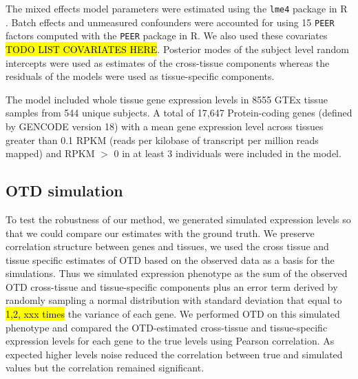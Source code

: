 \documentclass[10pt,letterpaper]{article}
\begin{document}
The mixed effects model parameters were estimated using the \texttt{lme4} package \cite{Bates_2015a} in R \cite{R_Core_Team_2015}. Batch effects and unmeasured confounders were accounted for using 15 \texttt{PEER} factors computed with the \texttt{PEER} \cite{Stegle_2012} package in R. 
We also used these covariates \hl{TODO LIST COVARIATES HERE}.
Posterior modes of the subject level random intercepts were used as estimates of the cross-tissue components whereas the residuals of the models were used as tissue-specific components.

The model included whole tissue gene expression levels in 8555 GTEx
tissue samples from 544 unique subjects. A total of 17,647
Protein-coding genes (defined by GENCODE \cite{Harrow_2012} version 18) with a
mean gene expression level across tissues greater than 0.1 RPKM (reads
per kilobase of transcript per million reads mapped) and RPKM $>$ 0 in at least 3 individuals were included in
the model. 


\subsection*{OTD simulation}

To test the robustness of our method, we generated simulated expression levels so that we could compare our estimates with the ground truth. We preserve correlation structure between genes and tissues, we used the cross tissue and tissue specific estimates of OTD based on the observed data as a basis for the simulations. Thus we simulated expression phenotype as the sum of the observed OTD cross-tissue and tissue-specific components plus an error term derived by randomly sampling a normal distribution with standard deviation that equal to \hl{1,2, xxx times} the variance of each gene. We performed OTD on this simulated phenotype and compared the OTD-estimated cross-tissue and tissue-specific expression levels for each gene to the true levels using Pearson correlation. As expected higher levels noise reduced the correlation between true and simulated values but the correlation remained significant.
\end{document}
